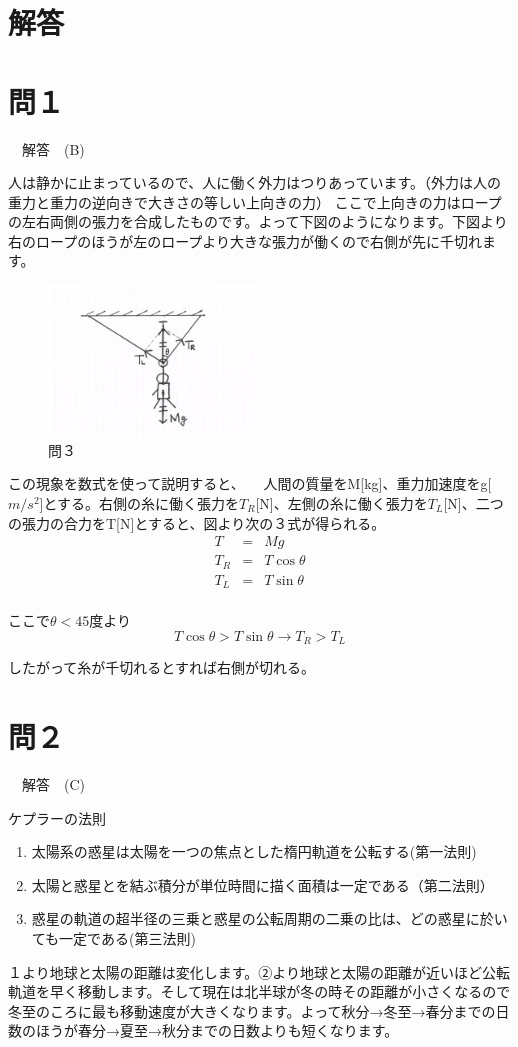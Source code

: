 \newpage
\section*{解答}
\section*{問１}
　解答　(B) \par
人は静かに止まっているので、人に働く外力はつりあっています。（外力は人の重力と重力の逆向きで大きさの等しい上向きの力）
ここで上向きの力はロープの左右両側の張力を合成したものです。よって下図のようになります。下図より右のロープのほうが左のロープより大きな張力が働くので右側が先に千切れます。
\begin{figure}[H]
  \centering
  \includegraphics[height=4cm,clip]{nishimura/image/toi1_A.jpg}
  \caption{問３}
  \label{fig:toi3}
\end{figure}
この現象を数式を使って説明すると、
　人間の質量をM[kg]、重力加速度をg[$m/s^2$]とする。右側の糸に働く張力を$ T_R$[N]、左側の糸に働く張力を$T_L$[N]、二つの張力の合力をT[N]とすると、図より次の３式が得られる。
\begin{eqnarray*}
T&=&Mg\\
T_R&=&T \cos \theta\\
T_L&=&T \sin \theta\\
\end{eqnarray*}

ここで$\theta<45$度より\\
$$T \cos \theta >T \sin \theta　\longrightarrow  　T_R > T_L$$ \par
したがって糸が千切れるとすれば右側が切れる。

\newpage
\section*{問２}
　解答　(C) \par
ケプラーの法則
\begin{enumerate}
\item	太陽系の惑星は太陽を一つの焦点とした楕円軌道を公転する(第一法則)
\item	太陽と惑星とを結ぶ積分が単位時間に描く面積は一定である（第二法則）
\item	惑星の軌道の超半径の三乗と惑星の公転周期の二乗の比は、どの惑星に於いても一定である(第三法則)
\end{enumerate}\par
１より地球と太陽の距離は変化します。②より地球と太陽の距離が近いほど公転軌道を早く移動します。そして現在は北半球が冬の時その距離が小さくなるので冬至のころに最も移動速度が大きくなります。よって秋分→冬至→春分までの日数のほうが春分→夏至→秋分までの日数よりも短くなります。

